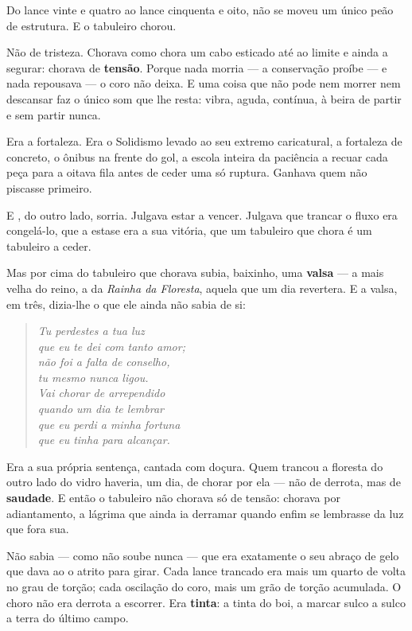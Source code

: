 \documentclass[livro.tex]{subfiles}
\begin{document}
Do lance vinte e quatro ao lance cinquenta e oito, não se moveu um único peão de
estrutura. E o tabuleiro chorou.

\medskip

Não de tristeza. Chorava como chora um cabo esticado até ao limite e ainda a
segurar: chorava de \textbf{tensão}. Porque nada morria --- a conservação proíbe ---
e nada repousava --- o coro não deixa. E uma coisa que não pode nem morrer nem
descansar faz o único som que lhe resta: vibra, aguda, contínua, à beira de partir e
sem partir nunca.

Era a fortaleza. Era o Solidismo levado ao seu extremo caricatural, a fortaleza de
concreto, o ônibus na frente do gol, a escola inteira da paciência a recuar cada
peça para a oitava fila antes de ceder uma só ruptura. Ganhava quem não piscasse
primeiro.

\medskip

E \Ven , do outro lado, sorria. Julgava estar a vencer. Julgava que trancar o fluxo
era congelá-lo, que a estase era a sua vitória, que um tabuleiro que chora é um
tabuleiro a ceder.

\medskip

Mas por cima do tabuleiro que chorava subia, baixinho, uma \textbf{valsa} --- a mais
velha do reino, a da \emph{Rainha da Floresta}, aquela que \Ven um dia revertera. E a
valsa, em três, dizia-lhe o que ele ainda não sabia de si:

\begin{verse}\itshape\small\color{cVenom}
Tu perdestes a tua luz\\
que eu te dei com tanto amor;\\
não foi a falta de conselho,\\
tu mesmo nunca ligou.\\[3pt]
Vai chorar de arrependido\\
quando um dia te lembrar\\
que eu perdi a minha fortuna\\
que eu tinha para alcançar.
\end{verse}

\medskip

Era a sua própria sentença, cantada com doçura. Quem trancou a floresta do outro lado
do vidro haveria, um dia, de chorar por ela --- não de derrota, mas de \textbf{saudade}.
E então o tabuleiro não chorava só de tensão: chorava por adiantamento, a lágrima que
\Ven ainda ia derramar quando enfim se lembrasse da luz que fora sua.

Não sabia --- como não soube nunca --- que era exatamente o seu abraço de gelo que
dava ao \Lck o atrito para girar. Cada lance trancado era mais um quarto de volta no
grau de torção; cada oscilação do coro, mais um grão de torção acumulada. O choro não era
derrota a escorrer. Era \textbf{tinta}: a tinta do boi, a marcar sulco a sulco a
terra do último campo.
\end{document}
